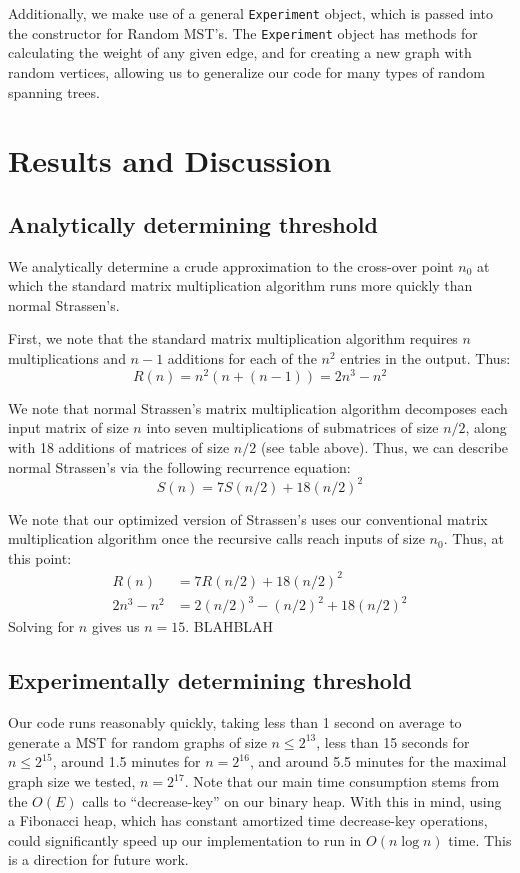 \documentclass[a4paper]{article}
\begin{document}
Additionally, we make use of a general \texttt{Experiment} object, which is passed into the constructor for Random MST's. The \texttt{Experiment} object has methods for calculating the weight of any given edge, and for creating a new graph with random vertices, allowing us to generalize our code for many types of random spanning trees. 

\section{Results and Discussion}

\subsection{Analytically determining threshold}
We analytically determine a crude approximation to the cross-over point $n_0$ at which the standard matrix multiplication algorithm runs more quickly than normal Strassen's.

First, we note that the standard matrix multiplication algorithm requires $n$ multiplications and $n-1$ additions for each of the $n^2$ entries in the output. Thus:
$$R(n) = n^2(n + (n-1)) = 2n^3 - n^2$$

We note that normal Strassen's matrix multiplication algorithm decomposes each input matrix of size $n$ into seven multiplications of submatrices of size $n/2$, along with 18 additions of matrices of size $n/2$ (see table above). Thus, we can describe normal Strassen's via the following recurrence equation: 
$$S(n) = 7S(n/2) + 18(n/2)^2$$

We note that our optimized version of Strassen's uses our conventional matrix multiplication algorithm once the recursive calls reach inputs of size $n_0$. Thus, at this point:
\begin{align*}
R(n) &= 7R(n/2) + 18(n/2)^2 \\
2n^3-n^2 &= 2(n/2)^3 - (n/2)^2 + 18(n/2)^2
\end{align*}
Solving for $n$ gives us $n=15$. BLAHBLAH


\subsection{Experimentally determining threshold}



Our code runs reasonably quickly, taking less than 1 second on average to generate a MST for random graphs of size $n\leq2^{13}$, less than 15 seconds for $n\leq 2^{15}$, around 1.5 minutes for $n=2^{16}$, and around 5.5 minutes for the maximal graph size we tested, $n=2^{17}$. Note that our main time consumption stems from the $O(E)$ calls to ``decrease-key'' on our binary heap. With this in mind, using a Fibonacci heap, which has constant amortized time decrease-key operations, could significantly speed up our implementation to run in $O(n\log n)$ time. This is a direction for future work.
\end{document}
